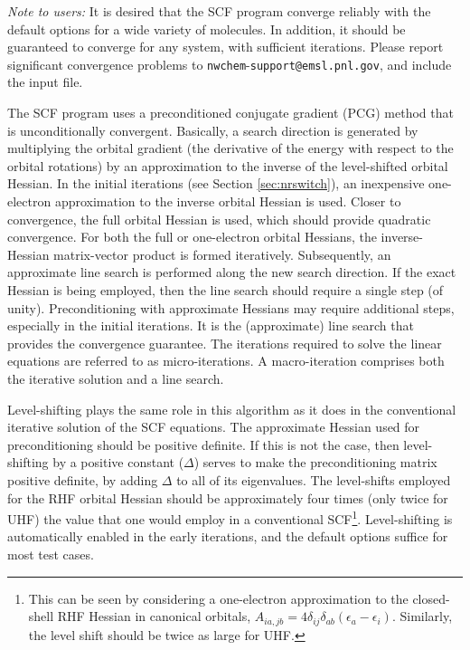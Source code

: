 {\em Note to users:} It is desired that the SCF program converge
reliably with the default options for a wide variety of molecules.  In
addition, it should be guaranteed to converge for any system, with
sufficient iterations.  Please report significant convergence problems
to \verb+nwchem+-\verb+support@+\-\verb+emsl.pnl.gov+, and include the
input file.


The SCF program uses a preconditioned conjugate gradient (PCG) method
that is unconditionally convergent.  Basically, a search direction is
generated by multiplying the orbital gradient (the derivative of the
energy with respect to the orbital rotations) by an approximation to
the inverse of the level-shifted orbital Hessian.  In the initial
iterations (see Section \ref{sec:nrswitch}), an inexpensive
one-electron approximation to the inverse orbital Hessian is used.
Closer to convergence, the full orbital Hessian is used, which should
provide quadratic convergence.  For both the full or one-electron
orbital Hessians, the inverse-Hessian matrix-vector product is formed
iteratively.  Subsequently, an approximate line search is performed
along the new search direction.  If the exact Hessian is being
employed, then the line search should require a single step (of
unity).  Preconditioning with approximate Hessians may require
additional steps, especially in the initial iterations.  It is the
(approximate) line search that provides the convergence guarantee.
The iterations required to solve the linear equations are referred to
as micro-iterations.  A macro-iteration comprises both the iterative
solution and a line search.

Level-shifting plays the same role in this algorithm as
it does in the conventional iterative solution of the SCF equations.
The approximate Hessian used for preconditioning should be positive
definite.  If this is not the case, then level-shifting by a positive
constant ($\Delta$) serves to make the preconditioning matrix positive
definite, by adding $\Delta$ to all of its eigenvalues.  The
level-shifts employed for the RHF orbital Hessian should be
approximately four times (only twice for UHF) the value that one would
employ in a conventional SCF\footnote{This can be seen by considering
  a one-electron approximation to the closed-shell RHF Hessian in
  canonical orbitals, $A_{ia,jb} = 4 \delta_{ij} \delta_{ab}
  (\epsilon_a - \epsilon_i)$.  Similarly, the level shift
  should be twice as large for UHF.}.  Level-shifting is automatically enabled
in the early iterations, and the default options suffice for most test
cases.

